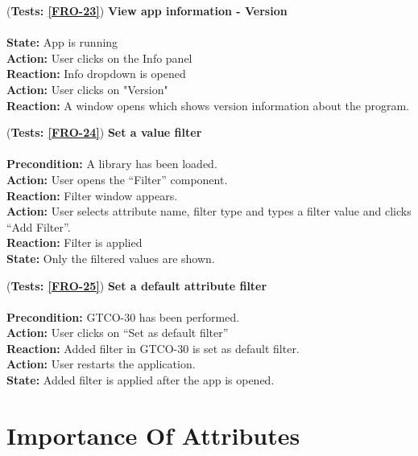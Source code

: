 \documentclass[10pt,a4paper]{report}
\newcommand{\precondition}[1]{
    \textbf{Precondition: } #1 \leavevmode \\
}
\newcommand{\action}[1]{
    \textbf{Action: } #1 \leavevmode \\
}
\newcommand{\state}[1]{
    \textbf{State: } #1 \leavevmode \\
}
\newcommand{\reaction}[1]{
    \textbf{Reaction: } #1 \leavevmode \\
}
\newcommand{\GTCODescription}[2]{
    (\textbf{Tests: #1}) \textbf{#2} \leavevmode \\
}
\begin{document}
\begin{GTCO}
     \item \GTCODescription{\ref{FRO-23}}
     {View app information - Version} \leavevmode \\ 
         \state{App is running}
         \action{User clicks on the Info panel}
         \reaction{Info dropdown is opened}
         \action{User clicks on "Version"}
         \reaction{A window opens which shows version information about the program.}\label{GTCO-28}

     \item \GTCODescription{\ref{FRO-24}}
     {Set a value filter} \leavevmode \\ 
         \precondition{A library has been loaded.}
         \action{User opens the “Filter” component.}
         \reaction{Filter window appears.}
         \action{User selects attribute name, filter type and types a filter value and clicks “Add Filter”.}
         \reaction{Filter is applied} 
         \state{Only the filtered values are shown.}\label{GTCO-29}
    

    \item \GTCODescription{\ref{FRO-25}}
    {Set a default attribute filter} \leavevmode \\ 
        \precondition{GTCO-30 has been performed.}
        \action{User clicks on “Set as default filter”}
        \reaction{Added filter in GTCO-30 is set as default filter.}
        \action{User restarts the application.}
        \state{Added filter is applied after the app is opened.}\label{GTCO-30}

\end{GTCO}

\chapter{Importance Of Attributes}
\end{document}
